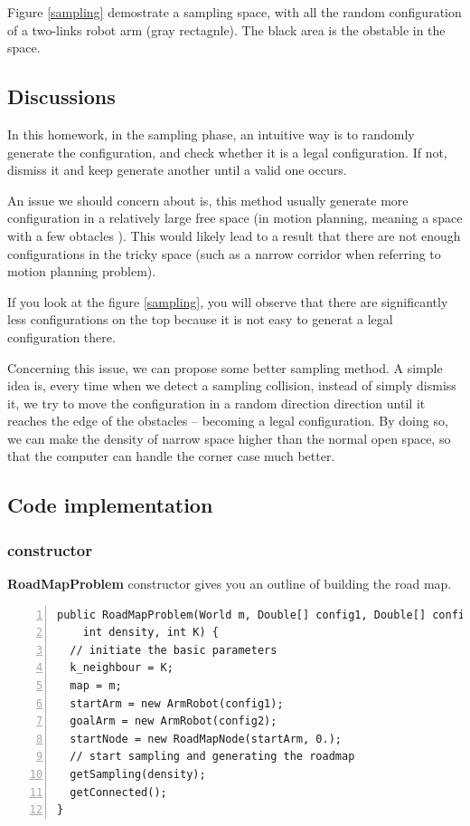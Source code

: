\documentclass{article}
\begin{document}
Figure \ref{sampling} demostrate a sampling space, with all the random configuration of a two-links robot arm (gray rectagnle). The black area is the obstable in the space. 

\subsection{Discussions}
In this homework, in the sampling phase, an intuitive way is to randomly generate the configuration, and check whether it is a legal configuration. If not, dismiss it and keep generate another until a valid one occurs. 

An issue we should concern about is, this method usually generate more configuration in a relatively large free space (in motion planning, meaning a space with a few obtacles ). This would likely lead to a result that there are not enough configurations in the tricky space (such as a narrow corridor when referring to motion planning problem).

If you look at the figure \ref{sampling}, you will observe that there are significantly less configurations on the top because it is not easy to generat a legal configuration there. 

Concerning this issue, we can propose some better sampling method.  A simple idea is, every time when we detect a sampling collision, instead of simply dismiss it, we try to move the configuration in a random direction direction until it reaches the edge of the obstacles -- becoming a legal configuration. By doing so, we can make the density of narrow space higher than the normal open space, so that the computer can handle the corner case much better.



\subsection{Code implementation}


\subsubsection{constructor}

\textbf{RoadMapProblem} constructor gives you an outline of building the road map.


\begin{lstlisting}[numbers=left]
public RoadMapProblem(World m, Double[] config1, Double[] config2,
    int density, int K) {
  // initiate the basic parameters 
  k_neighbour = K;
  map = m;
  startArm = new ArmRobot(config1);
  goalArm = new ArmRobot(config2);
  startNode = new RoadMapNode(startArm, 0.);
  // start sampling and generating the roadmap
  getSampling(density);
  getConnected();
}
\end{lstlisting}
\end{document}
